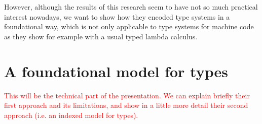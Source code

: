 \documentclass{article}
\begin{document}
However, although the results of this research seem to 
have not so much practical interest nowadays, we want to
show how they encoded type systems in a foundational way, 
which is not only applicable to type systems for machine 
code as they show for example with a usual typed lambda 
calculus.

\section*{A foundational model for types}

\textcolor{red}{This will be the technical part of the 
presentation. We can explain briefly their first approach
and its limitations, and show in a little more detail their 
second approach (i.e. an indexed model for types).}

{}

\end{document}
